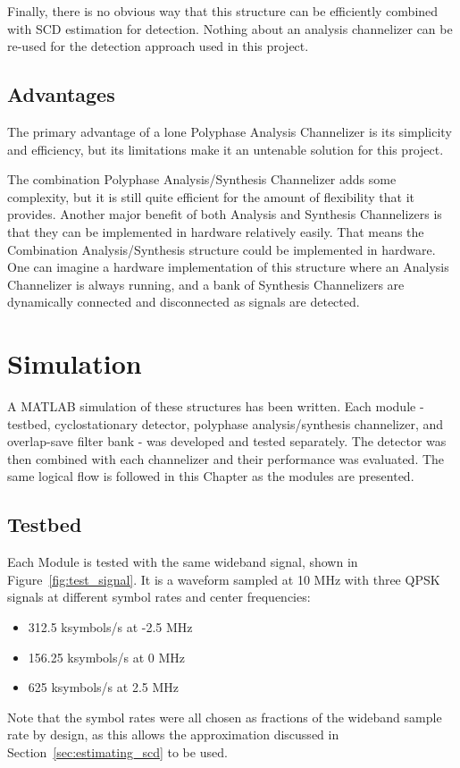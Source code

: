 \documentclass[12pt]{article}
\begin{document}
Finally, there is no obvious way that this structure can be efficiently
combined with SCD estimation for detection. Nothing about an analysis
channelizer can be re-used for the detection approach used in this project.

\subsection{Advantages}
\label{sec:poly_advantages}
The primary advantage of a lone Polyphase Analysis Channelizer is its
simplicity and efficiency, but its limitations make it an untenable solution
for this project.

The combination Polyphase Analysis/Synthesis Channelizer adds some complexity,
but it is still quite efficient for the amount of flexibility that it provides.
Another major benefit of both Analysis and Synthesis Channelizers is that they
can be implemented in hardware relatively easily. That means the Combination
Analysis/Synthesis structure could be implemented in hardware. One can imagine
a hardware implementation of this structure where an Analysis Channelizer is
always running, and a bank of Synthesis Channelizers are dynamically connected
and disconnected as signals
are detected.



\section{Simulation}
\label{sec:sim}
A MATLAB simulation of these structures has been written. Each module
- testbed, cyclostationary detector, polyphase analysis/synthesis channelizer,
and overlap-save filter bank - was developed and tested separately. The
detector was then combined with each channelizer and their performance was
evaluated.  The same logical flow is followed in this Chapter as the modules
are presented.

\subsection{Testbed}
Each Module is tested with the same wideband signal, shown in
Figure~\ref{fig:test_signal}. It is a waveform sampled at 10 MHz with three
QPSK signals at different symbol rates and center frequencies:
\begin{itemize}
    \item{312.5 ksymbols/s at -2.5 MHz}
    \item{156.25 ksymbols/s at 0 MHz}
    \item{625 ksymbols/s at 2.5 MHz}
\end{itemize}
Note that the symbol rates were all chosen as fractions of the wideband sample
rate by design, as this allows the approximation discussed in
Section~\ref{sec:estimating_scd} to be used.
\end{document}
